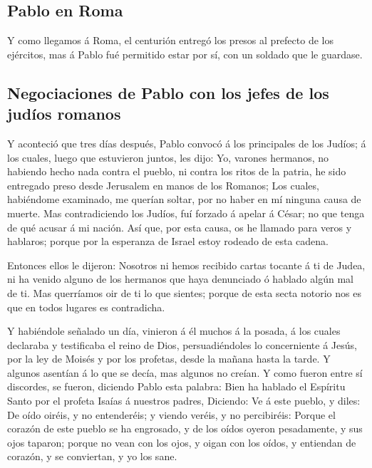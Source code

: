 \hypertarget{pablo-en-roma}{%
\subsection{Pablo en Roma}\label{pablo-en-roma}}

 Y como llegamos á Roma, el centurión entregó los presos
al prefecto de los ejércitos, mas á Pablo fué permitido estar por sí,
con un soldado que le guardase.

\hypertarget{negociaciones-de-pablo-con-los-jefes-de-los-juduxedos-romanos}{%
\subsection{Negociaciones de Pablo con los jefes de los judíos
romanos}\label{negociaciones-de-pablo-con-los-jefes-de-los-juduxedos-romanos}}

 Y aconteció que tres días después, Pablo convocó á los
principales de los Judíos; á los cuales, luego que estuvieron juntos,
les dijo: Yo, varones hermanos, no habiendo hecho nada contra el pueblo,
ni contra los ritos de la patria, he sido entregado preso desde
Jerusalem en manos de los Romanos;  Los cuales,
habiéndome examinado, me querían soltar, por no haber en mí ninguna
causa de muerte.  Mas contradiciendo los Judíos, fuí
forzado á apelar á César; no que tenga de qué acusar á mi nación.
 Así que, por esta causa, os he llamado para veros y
hablaros; porque por la esperanza de Israel estoy rodeado de esta
cadena.

 Entonces ellos le dijeron: Nosotros ni hemos recibido
cartas tocante á ti de Judea, ni ha venido alguno de los hermanos que
haya denunciado ó hablado algún mal de ti.  Mas
querríamos oir de ti lo que sientes; porque de esta secta notorio nos es
que en todos lugares es contradicha.

 Y habiéndole señalado un día, vinieron á él muchos á la
posada, á los cuales declaraba y testificaba el reino de Dios,
persuadiéndoles lo concerniente á Jesús, por la ley de Moisés y por los
profetas, desde la mañana hasta la tarde.  Y algunos
asentían á lo que se decía, mas algunos no creían.  Y
como fueron entre sí discordes, se fueron, diciendo Pablo esta palabra:
Bien ha hablado el Espíritu Santo por el profeta Isaías á nuestros
padres,  Diciendo: Ve á este pueblo, y diles: De oído
oiréis, y no entenderéis; y viendo veréis, y no percibiréis:
 Porque el corazón de este pueblo se ha engrosado, y de
los oídos oyeron pesadamente, y sus ojos taparon; porque no vean con los
ojos, y oigan con los oídos, y entiendan de corazón, y se conviertan, y
yo los sane.


